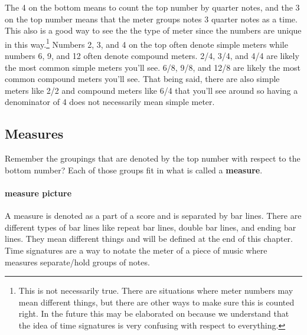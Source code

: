 \documentclass[../OpenAppliedMusicTheory.tex]{subfiles}
\begin{document}
        The 4 on the bottom means to count the top number by quarter notes, and the 3 on the top number means that the meter groups notes 3 quarter notes as a time. This also is a good way to see the the type of meter since the numbers are unique in this way.\footnote{This is not necessarily true. There are situations where meter numbers may mean different things, but there are other ways to make sure this is counted right. In the future this may be elaborated on because we understand that the idea of time signatures is very confusing with respect to everything.} Numbers 2, 3, and 4 on the top often denote simple meters while numbers 6, 9, and 12 often denote compound meters. 2/4, 3/4, and 4/4 are likely the most common simple meters you'll see. 6/8, 9/8, and 12/8 are likely the most common compound meters you'll see. That being said, there are also simple meters like 2/2 and compound meters like 6/4 that you'll see around so having a denominator of 4 does not necessarily mean simple meter. 


        \subsection{Measures}
        Remember the groupings that are denoted by the top number with respect to the bottom number? Each of those groups fit in what is called a \textbf{measure}. 

        \paragraph{measure picture}
        A measure is denoted as a part of a score and is separated by bar lines. There are different types of bar lines like repeat bar lines, double bar lines, and ending bar lines. They mean different things and will be defined at the end of this chapter. Time signatures are a way to notate the meter of a piece of music where measures separate/hold groups of notes.
\end{document}
